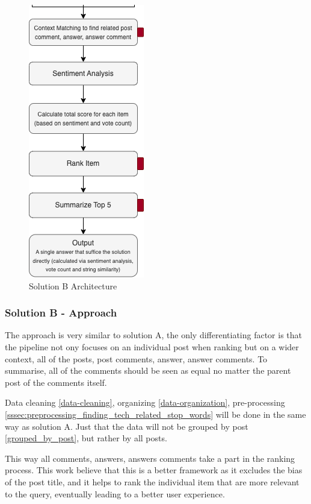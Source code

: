 \begin{figure}[H]
  \centering
  \noindent \includegraphics[scale=1]{slice_solution-b_2.png}
\caption{Solution B Architecture }\label{solution_b_architecture}
\end{figure}

\subsubsection{Solution B - Approach}
The approach is very similar to solution A, the only differentiating factor is that the pipeline not ony focuses on an individual post when ranking but on a wider context, all of the posts, post comments, answer, answer comments. To summarise, all of the comments should be seen as equal no matter the parent post of the comments itself. 

Data cleaning \ref{data-cleaning}, organizing \ref*{data-organization}, pre-processing \ref*{sssec:preprocessing_finding_tech_related_stop_words} will be done in the same way as solution A.  Just that the data will not be grouped by post \ref*{grouped_by_post}, but rather by all posts. 

This way all comments, answers, answers comments take a part in the ranking process. This work believe that this is a better framework as it excludes the bias of the post title, and it helps to rank the individual item that are more relevant to the query, eventually leading to a better user experience.

